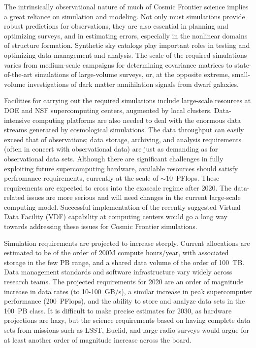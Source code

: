 The intrinsically observational nature of much of Cosmic Frontier
science implies a great reliance on simulation and modeling. Not only
must simulations provide robust predictions for observations, they are
also essential in planning and optimizing surveys, and in estimating
errors, especially in the nonlinear domains of structure
formation. Synthetic sky catalogs play important roles in testing and
optimizing data management and analysis. The scale of the required
simulations varies from medium-scale campaigns for determining
covariance matrices to state-of-the-art simulations of large-volume
surveys, or, at the opposite extreme, small-volume investigations of
dark matter annihilation signals from dwarf galaxies.

Facilities for carrying out the required simulations include
large-scale resources at DOE and NSF supercomputing centers, augmented
by local clusters. Data-intensive computing platforms are also needed
to deal with the enormous data streams generated by cosmological
simulations. The data throughput can easily exceed that of
observations; data storage, archiving, and analysis requirements
(often in concert with observational data) are just as demanding as
for observational data sets. Although there are significant challenges
in fully exploiting future supercomputing hardware, available
resources should satisfy perfromance requirements, currently at the
scale of $\sim$10~PFlops. These requirements are expected to cross into
the exascale regime after 2020. The data-related issues are more
serious and will need changes in the current large-scale computing
model. Successful implementation of the recently suggested Virtual
Data Facility (VDF) capability at computing centers would go a long
way towards addressing these issues for Cosmic Frontier simulations.

Simulation requirements are projected to increase steeply. Current
allocations are estimated to be of the order of 200M compute
hours/year, with associated storage in the few PB range, and a shared
data volume of the order of 100~TB. Data management standards and
software infrastructure vary widely across research teams. The
projected requirements for 2020 are an order of magnitude increase
in data rates (to 10-100~GB/s), a similar increase in peak
supercomputer performance (200~PFlops), and the ability to store and
analyze data sets in the 100~PB class. It is difficult to make precise
estimates for 2030, as hardware projections are hazy, but the
science requirements based on having complete data sets from missions
such as LSST, Euclid, and large radio surveys would argue for at least
another order of magnitude increase across the board.

